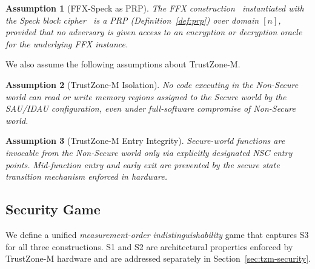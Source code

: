 \documentclass[journal]{IEEEtran}
\newtheorem{assumption}{Assumption}[section]
\begin{document}
\begin{assumption}[FFX-Speck as PRP]
\label{asm:ffx-prp}
The FFX construction~\cite{bellare2010ffx} instantiated with the Speck block
cipher~\cite{speck} is a PRP (Definition~\ref{def:prp}) over
domain $[n]$, provided that no adversary is given access to an
encryption or decryption oracle for the underlying FFX instance.
\end{assumption}

We also assume the following assumptions about TrustZone-M.
 
\begin{assumption}[TrustZone-M Isolation]
\label{asm:tz-isolation}
No code executing in the Non-Secure world can read or write memory
regions assigned to the Secure world by the SAU/IDAU configuration,
even under full-software compromise of Non-Secure world.
\end{assumption}
 
\begin{assumption}[TrustZone-M Entry Integrity]
\label{asm:tz-entry}
Secure-world functions are invocable from the Non-Secure world only via
explicitly designated NSC entry points.
Mid-function entry and early exit are prevented by the secure state transition mechanism enforced in hardware.
\end{assumption}
 
 
\subsection{Security Game}
\label{sec:game}
 
We define a unified \emph{measurement-order indistinguishability} game that
captures S3 for all three constructions.
S1 and S2 are architectural properties enforced by TrustZone-M hardware
and are addressed separately in Section~\ref{sec:tzm-security}.
 
\end{document}
